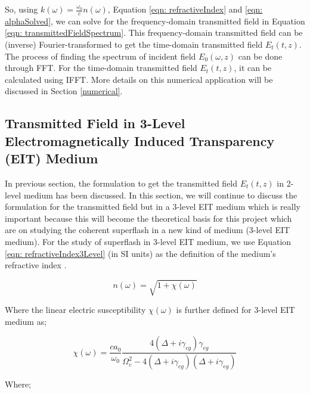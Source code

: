 So, using $k(\omega) = \frac{\omega_{0}}{c}n(\omega)$, Equation \ref{eqn: refractiveIndex} and \ref{eqn: alphaSolved}, we can solve for the frequency-domain transmitted field in Equation \ref{eqn: transmittedFieldSpectrum}. This frequency-domain transmitted field can be (inverse) Fourier-transformed to get the time-domain transmitted field $E_{t}(t, z)$. The process of finding the spectrum of incident field $E_{0}(\omega, z)$ can be done through FFT. For the time-domain transmitted field $E_{t}(t, z)$, it can be calculated using IFFT. More details on this numerical application will be discussed in Section \ref{numerical}.

\subsection{Transmitted Field in 3-Level Electromagnetically Induced Transparency (EIT) Medium}
In previous section, the formulation to get the transmitted field $E_{t}(t, z)$ in 2-level medium has been discussed. In this section, we will continue to discuss the formulation for the transmitted field but in a 3-level EIT medium which is really important because this will become the theoretical basis for this project which are on studying the coherent superflash in a new kind of medium (3-level EIT medium). For the study of superflash in 3-level EIT medium, we use Equation \ref{eqn: refractiveIndex3Level} (in SI units) as the definition of the medium's refractive index \cite{Braje2004, Jeong2009}.

\begin{equation}
    n(\omega) = \sqrt{1 + \chi(\omega)}
    \label{eqn: refractiveIndex3Level}
\end{equation}

Where the linear electric susceptibility $\chi(\omega)$ is further defined for 3-level EIT medium as;

\begin{equation}
    \chi(\omega) = \frac{ca_{0}}{\omega_{0}} \frac{4(\Delta + i\gamma_{cg})\gamma_{eg}}{\Omega_{c}^{2} - 4(\Delta + i\gamma_{cg})(\Delta + i\gamma_{eg})}
    \label{eqn: chi(w)}
\end{equation}

Where;

